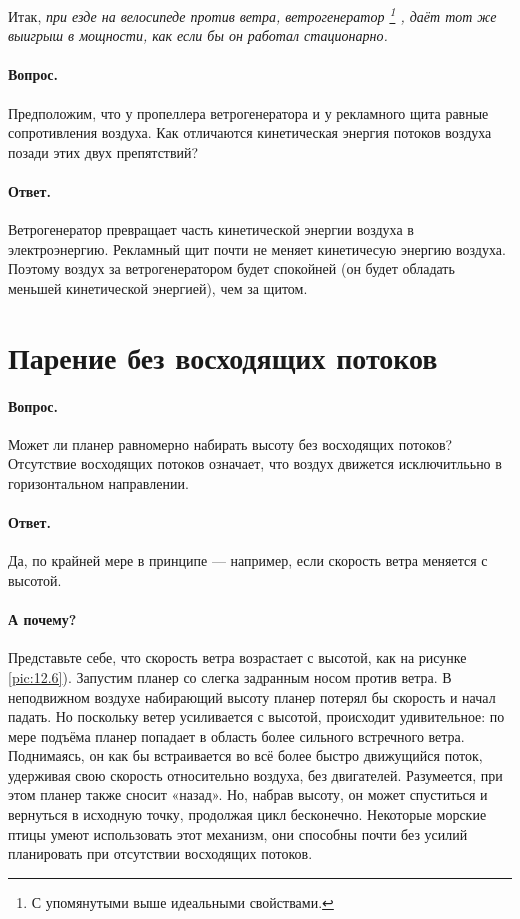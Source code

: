 Итак, \emph{при езде на велосипеде против ветра, ветрогенератор%
\footnote{С упомянутыми выше идеальными свойствами.}%
, даёт тот же выигрыш в мощности, как если бы он работал стационарно.}

\paragraph{Вопрос.} Предположим, что у пропеллера ветрогенератора и у рекламного щита равные сопротивления воздуха.
Как отличаются кинетическая энергия потоков воздуха позади этих двух препятствий?

\paragraph{Ответ.}
Ветрогенератор превращает часть кинетической энергии воздуха в электроэнергию.
Рекламный щит почти не меняет кинетичесую энергию воздуха.
Поэтому воздух за ветрогенератором будет спокойней (он будет обладать меньшей кинетической энергией), чем за щитом.

\section{Парение без восходящих потоков}

\paragraph{Вопрос.}
Может ли планер равномерно набирать высоту без восходящих потоков?
Отсутствие восходящих потоков означает, что воздух движется исключитлььно в горизонтальном направлении.

\paragraph{Ответ.}
Да, по крайней мере в принципе --- например, если скорость ветра меняется с высотой.

\paragraph{А почему?}
Представьте себе, что скорость ветра возрастает с высотой, как на рисунке \ref{pic:12.6}).
Запустим планер со слегка задранным носом против ветра.
В неподвижном воздухе набирающий высоту планер потерял бы скорость и начал падать.
Но поскольку ветер усиливается с высотой, происходит удивительное: по мере подъёма планер попадает в область более сильного встречного ветра.
Поднимаясь, он как бы встраивается во всё более быстро движущийся поток, удерживая свою скорость относительно воздуха, без двигателей.
Разумеется, при этом планер также сносит «назад».
Но, набрав высоту, он может спуститься и вернуться в исходную точку, продолжая цикл бесконечно.
Некоторые морские птицы умеют использовать этот механизм,
они способны почти без усилий планировать при отсутствии восходящих потоков.

